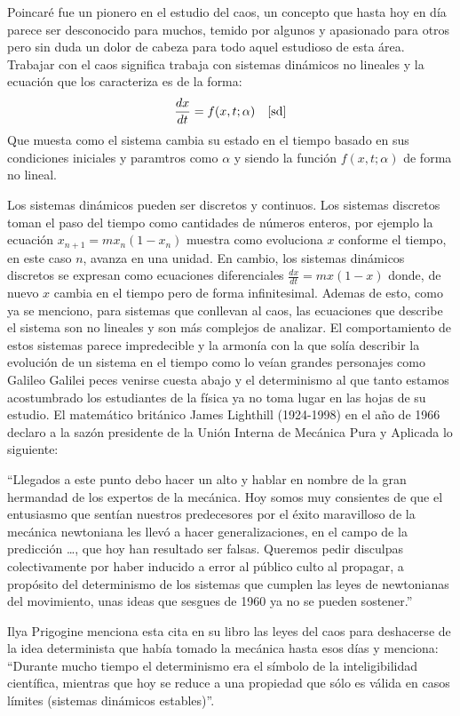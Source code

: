 \documentclass[11pt,twocolumn,spanish]{article}
\theoremstyle{definition}
\theoremstyle{remark}
\begin{document}
Poincaré fue un pionero en el estudio del caos, un concepto que hasta hoy en día parece ser desconocido para muchos, temido por algunos y apasionado para otros pero sin duda un dolor de cabeza para todo aquel estudioso de esta área. Trabajar con el caos significa trabaja con sistemas dinámicos no lineales y la ecuación que los caracteriza es de la forma:
\begin{equation}
\frac{dx}{dt} = f(x,t;\alpha)  \quad \cite{sd}
\end{equation}
Que muesta como el sistema cambia su estado en el tiempo basado en sus condiciones iniciales y paramtros como $\alpha$ y siendo la función $f(x,t;\alpha)$ de forma no lineal.

Los sistemas dinámicos pueden ser discretos y continuos. Los sistemas discretos toman el paso del tiempo como cantidades de números enteros, por ejemplo la ecuación $x_{n+1} = mx_{n}(1-x_{n})$ muestra como evoluciona $x$ conforme el tiempo, en este caso  $n$, avanza en una unidad. En cambio, los sistemas dinámicos discretos se expresan como ecuaciones diferenciales $\frac{dx}{dt} = mx(1-x)$ donde, de nuevo $x$ cambia en el tiempo pero de forma infinitesimal. Ademas de esto, como ya se menciono, para sistemas que conllevan al caos, las ecuaciones que describe el sistema son no lineales y son más complejos de analizar. El comportamiento de estos sistemas parece impredecible y la armonía con la que solía describir la evolución de un sistema en el tiempo como lo veían grandes personajes como Galileo Galilei peces venirse cuesta abajo y el determinismo al que tanto estamos acostumbrado los estudiantes de la física ya no toma lugar en las hojas de su estudio. El matemático británico James Lighthill (1924-1998) en el año de 1966 declaro a la sazón presidente de la Unión Interna de Mecánica Pura y Aplicada lo siguiente:

“Llegados a este punto debo hacer un alto y hablar en nombre de la gran hermandad de los expertos de la mecánica. Hoy somos muy consientes de que el entusiasmo que sentían nuestros predecesores por el éxito maravilloso de la mecánica newtoniana les llevó a hacer generalizaciones, en el campo de la predicción …, que hoy han resultado ser falsas. Queremos pedir disculpas colectivamente por haber inducido a error al público culto al propagar, a propósito del determinismo de los sistemas que cumplen las leyes de newtonianas del movimiento, unas ideas que sesgues de 1960 ya no se pueden sostener.” \cite{lig} 

Ilya Prigogine menciona esta cita en su libro las leyes del caos para deshacerse de la idea determinista que había tomado la mecánica hasta esos días y menciona: “Durante mucho tiempo el determinismo era el símbolo de la inteligibilidad científica, mientras que hoy se reduce a una propiedad que sólo es válida en casos límites (sistemas dinámicos estables)”\cite{ilya1}.
\end{document}
